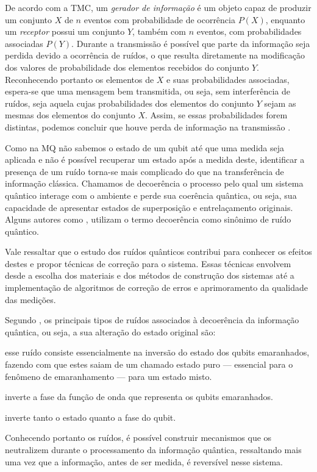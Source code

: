 De acordo com  a TMC, um \textit{gerador de informação} é um objeto capaz de produzir um conjunto $X$ de $n$ eventos com probabilidade de ocorrência $P(X)$, enquanto um \textit{receptor} possui um conjunto $Y$, também com $n$ eventos, com probabilidades associadas $P(Y)$. Durante a transmissão é possível que parte da informação seja perdida devido a ocorrência de ruídos, o que resulta diretamente na modificação dos valores de probabilidade dos elementos recebidos do conjunto $Y$. Reconhecendo portanto os elementos de $X$ e suas probabilidades associadas, espera-se que uma mensagem bem transmitida, ou seja, sem interferência de ruídos, seja aquela cujas probabilidades dos elementos do conjunto $Y$ sejam as mesmas dos elementos do conjunto $X$. Assim, se essas probabilidades forem distintas, podemos concluir que houve perda de informação na transmissão \cite{mathematical}.

Como na MQ não sabemos o estado de um qubit até que uma medida seja aplicada e não é possível recuperar um estado após a medida deste, identificar a presença de um ruído torna-se mais complicado do que na transferência de informação clássica. Chamamos de decoerência o processo pelo qual um sistema quântico interage com o ambiente e perde sua coerência quântica, ou seja, sua capacidade de apresentar estados de superposição e entrelaçamento originais. Alguns autores como \textcite{chuang}, utilizam o termo decoerência como sinônimo de ruído quântico.

Vale ressaltar que o estudo dos ruídos quânticos contribui para conhecer os efeitos destes e propor técnicas de correção para o sistema. Essas técnicas envolvem desde a escolha dos materiais e dos métodos de construção dos sistemas até a implementação de algoritmos de correção de erros e aprimoramento da qualidade das medições.

Segundo \textcite{teseufscar}, os principais tipos de ruídos associados à decoerência da informação quântica, ou seja, a sua alteração do estado original são:

\begin{description}\label{tiposruidos}
  \item [Inversão de bit (\textit{bitflip})] esse ruído consiste essencialmente na inversão do estado dos qubits emaranhados, fazendo com que estes saiam de um chamado estado puro --- essencial para o fenômeno de emaranhamento --- para um estado misto.
  \item [Inversão de fase (\textit{phaseflip})] inverte a fase da função de onda que representa os qubits emaranhados.
  \item [Inversão de bit e fase (\textit{bit-phase flip})] inverte tanto o estado quanto a fase do qubit.
\end{description}

Conhecendo portanto os ruídos, é possível construir mecanismos que os neutralizem durante o processamento da informação quântica, ressaltando mais uma vez que a informação, antes de ser medida, é reversível nesse sistema.
